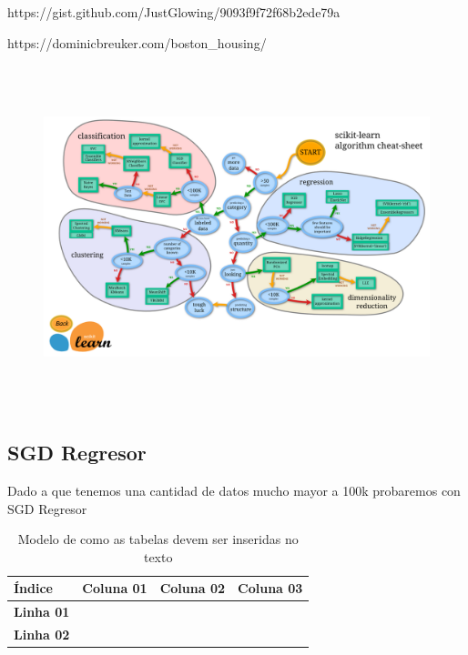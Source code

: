 https://gist.github.com/JustGlowing/9093f9f72f68b2ede79a

https://dominicbreuker.com/boston_housing/

\begin{figure}[h]
\centering
\includegraphics[height=10cm]{imagenes/sckit.png}
\label{fig:exemplo}
\end{figure}

\subsection{SGD Regresor}
Dado a que tenemos una cantidad de datos mucho mayor a 100k probaremos con SGD Regresor


\begin{table}[h]
\centering
\caption{ Modelo de como as tabelas devem ser inseridas no texto }
\vspace{0.2in}
%
\newcommand{\rowstyle}[1]{%
  \protected\gdef\currentrowstyle{#1}%
}
\begin{tabularx}{\textwidth}{>{\bf}C|C|C|C}
\hline 
\textbf {Índice} & \textbf{Coluna 01} &\textbf{ Coluna 02} & \textbf{Coluna 03} \\ \hline \hline
Linha 01 & & & \\ \hline
Linha 02 & & & \\ \hline                         

\end{tabularx}
\end{table}






